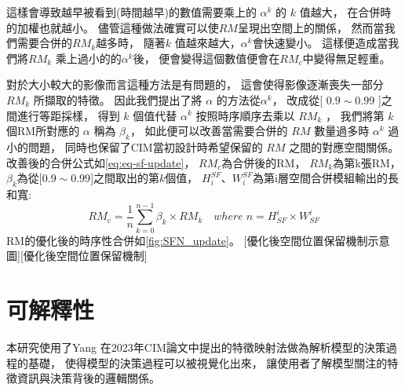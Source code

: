 \documentclass[class=NCU_thesis, crop=false]{standalone}
\begin{document}
	這樣會導致越早被看到(時間越早)的數值需要乘上的 $\alpha^{k}$ 的 $k$ 值越大，
	在合併時的加權也就越小。
	儘管這種做法確實可以使$RM$呈現出空間上的關係，
	然而當我們需要合併的$RM_{k}$越多時，
	隨著$k$ 值越來越大，$\alpha^{k}$會快速變小。
	這樣便造成當我們將$RM_{k}$ 乘上過小的的$\alpha^{k}$後，
	便會變得這個數值便會在$RM_{c}$中變得無足輕重。

	對於大小較大的影像而言這種方法是有問題的，
	這會使得影像逐漸喪失一部分$ RM_{k} $ 所擷取的特徵。
	因此我們提出了將 $\alpha$ 的方法從$\alpha^{k}$，
	改成從[ $0.9 \sim 0.99$ ]之間進行等距採樣，
	得到 $k$ 個值代替 $\alpha^{k}$ 按照時序順序去乘以 $RM_{k}$ ，
	我們將第 $k$ 個RM所對應的 $\alpha$ 稱為 $\beta_{k}$，
	如此便可以改善當需要合併的 $RM$ 數量過多時 $\alpha^{k}$ 過小的問題，
	同時也保留了CIM當初設計時希望保留的 $RM$ 之間的對應空間關係。\\
	改善後的合併公式如\cref{eq:eq-sf-update}，
	$RM_{c}$為合併後的RM，
	$RM_{k}$為第k張RM，
	$\beta_{k}$為從[$0.9 \sim 0.99$]之間取出的第$k$個值，
	${H}_{i}^{SF}$、${W}_{i}^{SF}$為第i層空間合併模組輸出的長和寬:\\
		\begin{equation}
		    \label{eq:eq-sf-update}
		    RM_{c}=\frac{1}{n} \sum_{k = 0}^{n-1} \beta_{k} \times RM_{k}  \quad where \; n = \textit{H}^{i}_{SF} \times \textit{W}^{i}_{SF}
		\end{equation}
	RM的優化後的時序性合併如\cref{fig:SFN_update}。
	[優化後空間位置保留機制示意圖][優化後空間位置保留機制]




\pagebreak
\section{可解釋性} 
本研究使用了Yang 在2023年CIM論文中提出的特徵映射法做為解析模型的決策過程的基礎，
使得模型的決策過程可以被視覺化出來，
讓使用者了解模型關注的特徵資訊與決策背後的邏輯關係。
\end{document}
